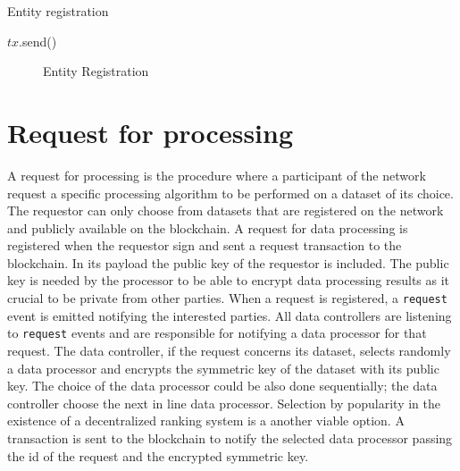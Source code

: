\begin{algorithm}[!htb]
  \caption{Entity registration}\label{alg:entity_registration}
  \begin{algorithmic}[1]
    \State $tx$.send()
    \State {}
  \EndProcedure
  \end{algorithmic}
\end{algorithm}

\begin{figure}[ht!]
  \caption{Entity Registration}
  \label{fig:arch:entity_reg}
\end{figure}

\section{Request for processing}
\label{solution:flow:pr_req}

A request for processing is the procedure where a participant of the network request a specific processing algorithm to be performed on a dataset of its choice. The requestor can only choose from datasets that are registered on the network and publicly available on the blockchain. A request for data processing is registered when the requestor sign and sent a request transaction to the blockchain. In its payload the public key of the requestor is included. The public key is needed by the processor to be able to encrypt data processing results as it crucial to be private from other parties. When a request is registered, a \verb|request| event is emitted notifying the interested parties. All data controllers are listening to \verb|request| events and are responsible for notifying a data processor for that request. The data controller, if the request concerns its dataset, selects randomly a data processor and encrypts the symmetric key of the dataset with its public key. The choice of the data processor could be also done sequentially; the data controller choose the next in line data processor. Selection by popularity in the existence of a decentralized ranking system is a another viable option. A transaction is sent to the blockchain to notify the selected data processor passing the id of the request and the encrypted symmetric key.

